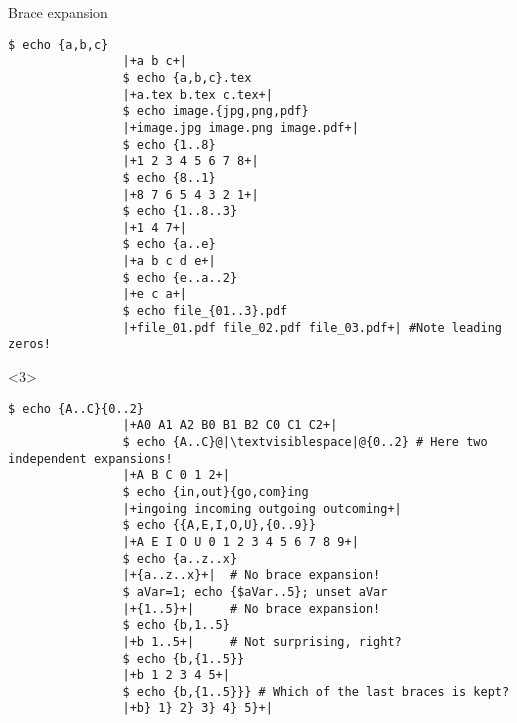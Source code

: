 \begin{frame}[fragile]{Brace expansion}
\begin{overlayarea}{\textwidth}{0.7\textheight}
\begin{onlyenv}
\begin{lstlisting}[style=MyBash, style=oddnumbers, aboveskip=5mm]
                $ echo {a,b,c}
                |+a b c+|
                $ echo {a,b,c}.tex
                |+a.tex b.tex c.tex+|
                $ echo image.{jpg,png,pdf}
                |+image.jpg image.png image.pdf+|
                $ echo {1..8}
                |+1 2 3 4 5 6 7 8+|
                $ echo {8..1}
                |+8 7 6 5 4 3 2 1+|
                $ echo {1..8..3}
                |+1 4 7+|
                $ echo {a..e}
                |+a b c d e+|
                $ echo {e..a..2}
                |+e c a+|
                $ echo file_{01..3}.pdf
                |+file_01.pdf file_02.pdf file_03.pdf+| #Note leading zeros!
            \end{lstlisting}
        \end{onlyenv}
        \begin{onlyenv}<3>
            \begin{lstlisting}[style=MyBash, style=oddnumbers, aboveskip=5mm, firstnumber=18]
                $ echo {A..C}{0..2}
                |+A0 A1 A2 B0 B1 B2 C0 C1 C2+|
                $ echo {A..C}@|\textvisiblespace|@{0..2} # Here two independent expansions!
                |+A B C 0 1 2+|
                $ echo {in,out}{go,com}ing
                |+ingoing incoming outgoing outcoming+|
                $ echo {{A,E,I,O,U},{0..9}}
                |+A E I O U 0 1 2 3 4 5 6 7 8 9+|
                $ echo {a..z..x}
                |+{a..z..x}+|  # No brace expansion!
                $ aVar=1; echo {$aVar..5}; unset aVar
                |+{1..5}+|     # No brace expansion!
                $ echo {b,1..5}
                |+b 1..5+|     # Not surprising, right?
                $ echo {b,{1..5}}
                |+b 1 2 3 4 5+|
                $ echo {b,{1..5}}} # Which of the last braces is kept?
                |+b} 1} 2} 3} 4} 5}+|
            \end{lstlisting}
        \end{onlyenv}
    \end{overlayarea}
\end{frame}
